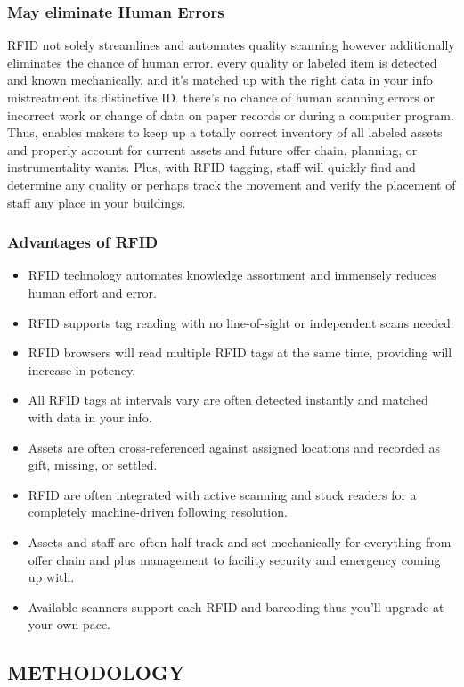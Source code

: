 \documentclass[12pt]{article}
\begin{document}
\subsubsection{May eliminate Human Errors}
RFID not solely streamlines and automates quality scanning however additionally eliminates the chance of human error. every quality or labeled item is detected and known mechanically, and it's matched up with the right data in your info mistreatment its distinctive ID. there's no chance of human scanning errors or incorrect work or change of data on paper records or during a computer program. Thus, enables makers to keep up a totally correct inventory of all labeled assets and properly account for current assets and future offer chain, planning, or instrumentality wants. Plus, with RFID tagging, staff will quickly find and determine any quality or perhaps track the movement and verify the placement of staff any place in your buildings.
\subsubsection{Advantages of RFID}
\begin{itemize}
\item RFID technology automates knowledge assortment and immensely reduces human effort and error.
\item RFID supports tag reading with no line-of-sight or independent scans needed.
\item RFID browsers will read multiple RFID tags at the same time, providing will increase in potency.
\item All RFID tags at intervals vary are often detected instantly and matched with data in your info.
\item Assets are often cross-referenced against assigned locations and recorded as gift, missing, or settled.
\item RFID are often integrated with active scanning and stuck readers for a completely machine-driven following resolution.
\item Assets and staff are often half-track and set mechanically for everything from offer chain and plus management to facility security and emergency coming up with.
\item Available scanners support each RFID and barcoding thus you'll upgrade at your own pace.
\end{itemize}
\newpage
\begin{center}
\section{METHODOLOGY}
\end{center}
\end{document}
